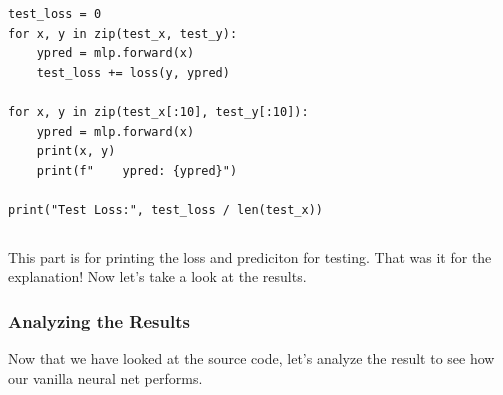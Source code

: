 \documentclass[../../main.tex]{subfiles}
\begin{document}
\begin{jupyter}
\begin{lstlisting}[style=jin]
test_loss = 0
for x, y in zip(test_x, test_y):
    ypred = mlp.forward(x)
    test_loss += loss(y, ypred)

for x, y in zip(test_x[:10], test_y[:10]):
    ypred = mlp.forward(x)
    print(x, y)
    print(f"    ypred: {ypred}")

print("Test Loss:", test_loss / len(test_x))
\end{lstlisting}
\begin{lstlisting}[style=jout]
\end{lstlisting}
\end{jupyter}

This part is for printing the loss and prediciton for testing.
That was it for the explanation! Now let's take a look at the
results.

\subsubsection{Analyzing the Results}

Now that we have looked at the source code, let's analyze the result
to see how our vanilla neural net performs.
\end{document}
